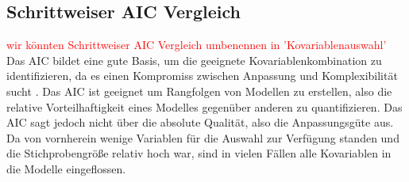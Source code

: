 \documentclass{Vorlage}
\begin{document}
\subsection{Schrittweiser AIC Vergleich}
\textcolor{red}{wir könnten Schrittweiser AIC Vergleich umbenennen in 'Kovariablenauswahl'}
Das AIC bildet eine gute Basis, um die geeignete Kovariablenkombination zu identifizieren, da es einen Kompromiss zwischen Anpassung und Komplexibilität sucht \cite{Akaike1981}. Das AIC ist geeignet um Rangfolgen von Modellen zu erstellen, also die relative Vorteilhaftigkeit eines Modelles gegenüber anderen zu quantifizieren. Das AIC sagt jedoch nicht über die absolute Qualität, also die Anpassungsgüte aus. Da von vornherein wenige Variablen für die Auswahl zur Verfügung standen und die Stichprobengröße relativ hoch war, sind in vielen Fällen alle Kovariablen in die Modelle eingeflossen.
\end{document}
